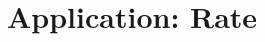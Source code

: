 \ifx\mainfile\undefined

\setcounter{chapter}{6} %
\fi

\cleardoublepage
\chapter{Application: Rate}
\label{chap:rate}

\ifx\mainfile\undefined

\fi
